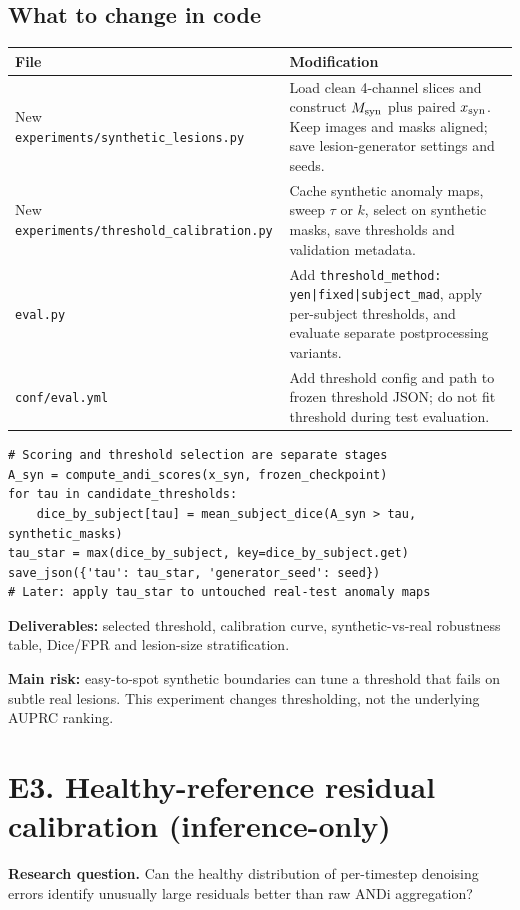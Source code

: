 \documentclass[10pt,a4paper]{article}
\newcommand{\file}[1]{\nolinkurl{#1}}
\newcommand{\hyps}[1]{\begin{summarybox}\textbf{Research question.} #1\end{summarybox}}
\begin{document}
\subsection{What to change in code}
\begin{tabularx}{\linewidth}{@{}p{39mm}X@{}}
\toprule File & Modification\\\midrule
New \file{experiments/synthetic_lesions.py} & Load clean 4-channel slices and construct $M_{\rm syn}$ plus paired $x_{\rm syn}$. Keep images and masks aligned; save lesion-generator settings and seeds.\\
New \file{experiments/threshold_calibration.py} & Cache synthetic anomaly maps, sweep $\tau$ or $k$, select on synthetic masks, save thresholds and validation metadata.\\
\file{eval.py} & Add \file{threshold_method: yen|fixed|subject_mad}, apply per-subject thresholds, and evaluate separate postprocessing variants.\\
\file{conf/eval.yml} & Add threshold config and path to frozen threshold JSON; do not fit threshold during test evaluation.\\\bottomrule
\end{tabularx}
\begin{lstlisting}
# Scoring and threshold selection are separate stages
A_syn = compute_andi_scores(x_syn, frozen_checkpoint)
for tau in candidate_thresholds:
    dice_by_subject[tau] = mean_subject_dice(A_syn > tau, synthetic_masks)
tau_star = max(dice_by_subject, key=dice_by_subject.get)
save_json({'tau': tau_star, 'generator_seed': seed})
# Later: apply tau_star to untouched real-test anomaly maps
\end{lstlisting}
\textbf{Deliverables:} selected threshold, calibration curve, synthetic-vs-real robustness table, Dice/FPR and lesion-size stratification.\par
\textbf{Main risk:} easy-to-spot synthetic boundaries can tune a threshold that fails on subtle real lesions. This experiment changes thresholding, not the underlying AUPRC ranking.
\section{E3. Healthy-reference residual calibration (inference-only)}
\hyps{Can the healthy distribution of per-timestep denoising errors identify unusually large residuals better than raw ANDi aggregation?}
\end{document}

